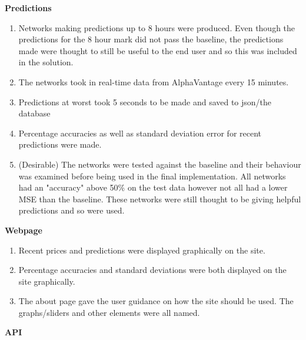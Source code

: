    \item \textbf{Predictions}
    \begin{enumerate}
        
        \item Networks making predictions up to 8 hours were produced. Even though the predictions for the 8 hour mark did not pass the baseline, the predictions made were thought to still be useful to the end user and so this was included in the solution.
        
        \item The networks took in real-time data from AlphaVantage every 15 minutes.
        
        \item Predictions at worst took 5 seconds to be made and saved to json/the database
        
        \item Percentage accuracies as well as standard deviation error for recent predictions were made.
    
        \item (Desirable) The networks were tested against the baseline and their behaviour was examined before being used in the final implementation. All networks had an "accuracy" above 50\% on the test data however not all had a lower MSE than the baseline. These networks were still thought to be giving helpful predictions and so were used.
    \end{enumerate}

    \item \textbf{Webpage}
    
    \begin{enumerate}
        \item Recent prices and predictions were displayed graphically on the site.
        
        \item Percentage accuracies and standard deviations were both displayed on the site graphically.
        
        \item The about page gave the user guidance on how the site should be used. The graphs/sliders and other elements were all named.
    \end{enumerate}

    \item \textbf{API}
    
